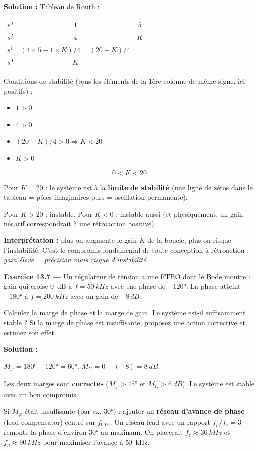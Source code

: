 \documentclass[12pt,a4paper,twoside]{book}
\begin{document}
\begin{pratique}
\textbf{Solution :} Tableau de Routh :

\begin{center}
\begin{tabular}{c|cc}
$s^3$ & $1$ & $5$ \\
$s^2$ & $4$ & $K$ \\
$s^1$ & $(4\times5 - 1\times K)/4 = (20-K)/4$ & \\
$s^0$ & $K$ & \\
\end{tabular}
\end{center}

Conditions de stabilité (tous les éléments de la 1ère colonne de même signe, ici positifs) :
\begin{itemize}[nosep]
\item $1 > 0$ \checkmark
\item $4 > 0$ \checkmark
\item $(20-K)/4 > 0 \Rightarrow K < 20$
\item $K > 0$
\end{itemize}

\[
\boxed{0 < K < 20}
\]

Pour $K = 20$ : le système est à la \textbf{limite de stabilité} (une ligne de zéros dans le tableau = pôles imaginaires purs = oscillation permanente).

Pour $K > 20$ : instable. Pour $K < 0$ : instable aussi (et physiquement, un gain négatif correspondrait à une rétroaction positive).

\textbf{Interprétation :} plus on augmente le gain $K$ de la boucle, plus on risque l'instabilité. C'est le compromis fondamental de toute conception à rétroaction : \textit{gain élevé = précision mais risque d'instabilité}.
\end{pratique}

\textbf{Exercice 13.7 ---} Un régulateur de tension a une FTBO dont le Bode montre : gain qui croise \SI{0}{dB} à $f = \SI{50}{kHz}$ avec une phase de $-120°$. La phase atteint $-180°$ à $f = \SI{200}{kHz}$ avec un gain de $\SI{-8}{dB}$.

Calculez la marge de phase et la marge de gain. Le système est-il suffisamment stable ? Si la marge de phase est insuffisante, proposez une action corrective et estimez son effet.

\begin{pratique}
\textbf{Solution :}

$M_\varphi = 180° - 120° = 60°$. $M_G = 0 - (-8) = \SI{8}{dB}$.

Les deux marges sont \textbf{correctes} ($M_\varphi > 45°$ et $M_G > \SI{6}{dB}$). Le système est stable avec un bon compromis.

Si $M_\varphi$ était insuffisante (par ex. $30°$) : ajouter un \textbf{réseau d'avance de phase} (lead compensator) centré sur $f_{0\text{dB}}$. Un réseau lead avec un rapport $f_p/f_z = 3$ remonte la phase d'environ $30°$ au maximum. On placerait $f_z \approx \SI{30}{kHz}$ et $f_p \approx \SI{90}{kHz}$ pour maximiser l'avance à \SI{50}{kHz}.
\end{pratique}
\end{document}
